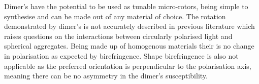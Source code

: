 Dimer's have the potential to be used as tunable micro-rotors, being 
simple to synthesise and can be made out of any material of choice.
The rotation demonstrated by dimer's is not accurately described in
previous literature which raises questions on the interactions between
circularly polarised light and spherical aggregates. Being made up of
homogenous materials their is no change in polarisation as expected
by birefringence. Shape birefringence is also not applicable as the 
preferred orientation is perpendicular to the polarisation axis, 
meaning there can be no asymmetry in the dimer's susceptibility. 
